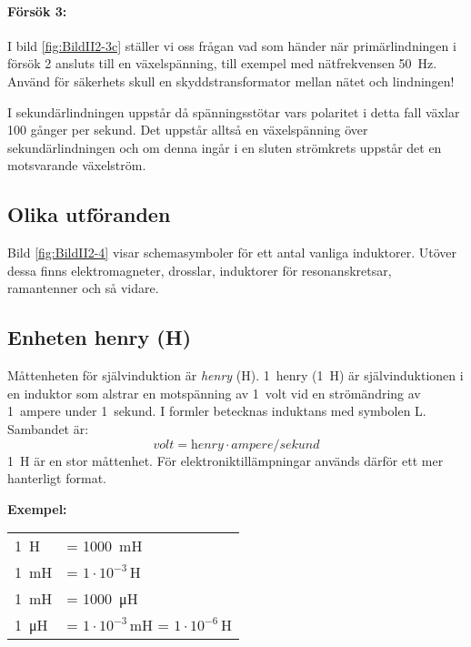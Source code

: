 \paragraph{Försök 3:}
I bild \ref{fig:BildII2-3c} ställer vi oss frågan vad som händer när
primärlindningen i försök 2 ansluts till en växelspänning, till exempel
med nätfrekvensen \SI{50}{\hertz}.
Använd för säkerhets skull en skyddstransformator mellan nätet och lindningen!

I sekundärlindningen uppstår då spänningsstötar vars polaritet i detta fall
växlar 100 gånger per sekund. Det uppstår alltså en växelspänning över
sekundärlindningen och om denna ingår i en sluten strömkrets uppstår det en
motsvarande växelström.


\subsection{Olika utföranden}

Bild \ref{fig:BildII2-4} visar schemasymboler för ett antal vanliga induktorer.
Utöver dessa finns elektromagneter, drosslar, induktorer för resonanskretsar,
ramantenner och så vidare.


\subsection{Enheten henry (H)}
\label{enheten_henry}

Måttenheten för självinduktion är \emph{henry} (\si{\henry}).
1~henry (\SI{1}{\henry}) är självinduktionen i en induktor som alstrar en
motspänning av 1~volt vid en strömändring av 1~ampere under 1~sekund.
I formler betecknas induktans med symbolen L.
Sambandet är:
\[\textit{volt} = \textit{henry} \cdot \textit{ampere}/\textit{sekund}\]
\SI{1}{\henry} är en stor måttenhet.
För elektroniktillämpningar används därför ett mer hanterligt format.

\noindent\textbf{Exempel:}

\begin{center}
\begin{tabular}{ll}
\SI{1}{\henry} & = \SI{1000}{\milli\henry} \\
\SI{1}{\milli\henry} & = \(1 \cdot 10^{-3}\)\,H \\
\SI{1}{\milli\henry} & = \SI{1000}{\micro\henry} \\
\SI{1}{\micro\henry} & = \(1 \cdot 10^{-3}\)\,mH = \(1 \cdot 10^{-6}\)\,H
\end{tabular}
\end{center}

